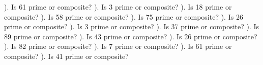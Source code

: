 \documentclass{article}%
\begin{document}
). Is 61 prime or composite?%
\newline%
\newline%
). Is 3 prime or composite?%
\newline%
\newline%
). Is 18 prime or composite?%
\newline%
\newline%
). Is 58 prime or composite?%
\newline%
\newline%
). Is 75 prime or composite?%
\newline%
\newline%
). Is 26 prime or composite?%
\newline%
\newline%
). Is 3 prime or composite?%
\newline%
\newline%
). Is 37 prime or composite?%
\newline%
\newline%
). Is 89 prime or composite?%
\newline%
\newline%
). Is 43 prime or composite?%
\newline%
\newline%
). Is 26 prime or composite?%
\newline%
\newline%
). Is 82 prime or composite?%
\newline%
\newline%
). Is 7 prime or composite?%
\newline%
\newline%
). Is 61 prime or composite?%
\newline%
\newline%
). Is 41 prime or composite?%
\end{document}
